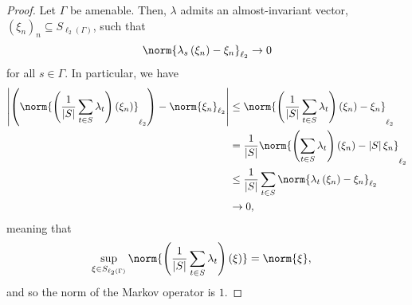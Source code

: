 \documentclass[10pt]{mypackage}
\begin{document}
\begin{proof}
  Let $\Gamma$ be amenable. Then, $\lambda$ admits an almost-invariant vector, $\left(\xi_n\right)_n\subseteq S_{\ell_2\left(\Gamma\right)}$, such that
  \begin{align*}
    \norm{\lambda_s\left(\xi_n\right) -\xi_n}_{\ell_2} \rightarrow 0
  \end{align*}
  for all $s\in \Gamma$. In particular, we have
  \begin{align*}
    \left\vert \left(\norm{\left(\frac{1}{\left\vert S \right\vert}\sum_{t\in S}\lambda_t\right)\left(\xi_n\right)}_{\ell_2}\right)  - \norm{\xi_n}_{\ell_2}\right\vert &\leq \norm{\left(\frac{1}{\left\vert S \right\vert}\sum_{t\in S}\lambda_t\right)\left(\xi_n\right) - \xi_n}_{\ell_2}\\
                                                                                                                                                                                  &= \frac{1}{\left\vert S \right\vert}\norm{\left(\sum_{t\in S}\lambda_t\right)\left(\xi_n\right) - \left\vert S \right\vert\xi_n}_{\ell_2}\\
                                                                                                                        &\leq \frac{1}{\left\vert S \right\vert} \sum_{t\in S}\norm{\lambda_t\left(\xi_n\right) - \xi_n}_{\ell_2}\\
                                                                                                                        &\rightarrow 0,
  \end{align*}
  meaning that
  \begin{align*}
    \sup_{\xi\in S_{\ell_2\left(\Gamma\right)}} \norm{\left(\frac{1}{\left\vert S \right\vert}\sum_{t\in S}\lambda_t\right)\left(\xi\right)} &= \norm{\xi},
  \end{align*}
  and so the norm of the Markov operator is $1$.\newline


\end{proof}
\end{document}
